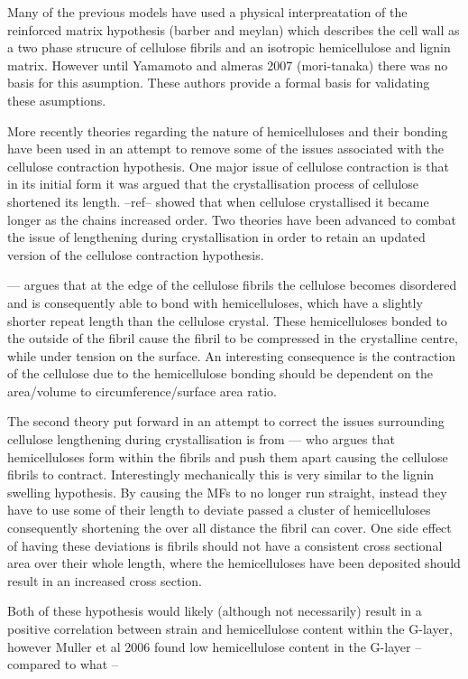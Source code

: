 \documentclass{article}
\begin{document}
Many of the previous models have used a physical interpreatation of the
reinforced matrix hypothesis (barber and meylan) which describes the cell wall
as a two phase strucure of cellulose fibrils and an isotropic hemicellulose and
lignin matrix. However until Yamamoto and almeras 2007 (mori-tanaka) there was
no basis for this asumption. These authors provide a formal basis for validating
these asumptions.

More recently theories regarding the nature of hemicelluloses and their bonding
have been used in an attempt to remove some of the issues associated with the
cellulose contraction hypothesis. One major issue of cellulose contraction is
that in its initial form it was argued that the crystallisation process of cellulose
shortened its length. --ref-- showed that when cellulose crystallised it became
longer as the chains increased order. Two theories have been advanced to combat
the issue of lengthening during crystallisation in order to retain an updated
version of the cellulose contraction hypothesis.

--- argues that at the edge of the cellulose fibrils the cellulose becomes
disordered and is consequently able to bond with hemicelluloses, which have a
slightly shorter repeat length than the cellulose crystal. These hemicelluloses
bonded to the outside of the fibril cause the fibril to be compressed in the
crystalline centre, while under tension on the surface. An interesting consequence
is the contraction of the cellulose due to the hemicellulose bonding should be
dependent on the area/volume to circumference/surface area ratio.

The second theory put forward in an attempt to correct the issues surrounding
cellulose lengthening during crystallisation is from --- who argues that
hemicelluloses form within the fibrils and push them apart causing the
cellulose fibrils to contract. Interestingly mechanically this is very similar
to the lignin swelling hypothesis. By causing the MFs to no longer run straight,
instead they have to use some of their length to deviate passed a cluster of
hemicelluloses consequently shortening the over all distance the fibril can
cover. One side effect of having these deviations is fibrils should not have a
consistent cross sectional area over their whole length, where the
hemicelluloses have been deposited should result in an increased cross section.

Both of these hypothesis would likely (although not necessarily) result in a
positive correlation between strain and hemicellulose content within the
G-layer, however Muller et al 2006 found low hemicellulose content in the
G-layer --compared to what --
\end{document}

